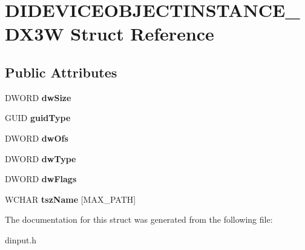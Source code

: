 \hypertarget{struct_d_i_d_e_v_i_c_e_o_b_j_e_c_t_i_n_s_t_a_n_c_e___d_x3_w}{\section{D\-I\-D\-E\-V\-I\-C\-E\-O\-B\-J\-E\-C\-T\-I\-N\-S\-T\-A\-N\-C\-E\-\_\-\-D\-X3\-W Struct Reference}
\label{struct_d_i_d_e_v_i_c_e_o_b_j_e_c_t_i_n_s_t_a_n_c_e___d_x3_w}
}
\subsection*{Public Attributes}
\begin{DoxyCompactItemize}
\item 
\hypertarget{struct_d_i_d_e_v_i_c_e_o_b_j_e_c_t_i_n_s_t_a_n_c_e___d_x3_w_a5538637b5f438adc654a96ebf8ae12fa}{D\-W\-O\-R\-D {\bfseries dw\-Size}}\label{struct_d_i_d_e_v_i_c_e_o_b_j_e_c_t_i_n_s_t_a_n_c_e___d_x3_w_a5538637b5f438adc654a96ebf8ae12fa}

\item 
\hypertarget{struct_d_i_d_e_v_i_c_e_o_b_j_e_c_t_i_n_s_t_a_n_c_e___d_x3_w_a94c5c2d3d83ded4017a022067231b21f}{G\-U\-I\-D {\bfseries guid\-Type}}\label{struct_d_i_d_e_v_i_c_e_o_b_j_e_c_t_i_n_s_t_a_n_c_e___d_x3_w_a94c5c2d3d83ded4017a022067231b21f}

\item 
\hypertarget{struct_d_i_d_e_v_i_c_e_o_b_j_e_c_t_i_n_s_t_a_n_c_e___d_x3_w_a0d449fb29324f67ea8309b64b2fd6fe8}{D\-W\-O\-R\-D {\bfseries dw\-Ofs}}\label{struct_d_i_d_e_v_i_c_e_o_b_j_e_c_t_i_n_s_t_a_n_c_e___d_x3_w_a0d449fb29324f67ea8309b64b2fd6fe8}

\item 
\hypertarget{struct_d_i_d_e_v_i_c_e_o_b_j_e_c_t_i_n_s_t_a_n_c_e___d_x3_w_a896c6388d90b67f03ad692778b1a656a}{D\-W\-O\-R\-D {\bfseries dw\-Type}}\label{struct_d_i_d_e_v_i_c_e_o_b_j_e_c_t_i_n_s_t_a_n_c_e___d_x3_w_a896c6388d90b67f03ad692778b1a656a}

\item 
\hypertarget{struct_d_i_d_e_v_i_c_e_o_b_j_e_c_t_i_n_s_t_a_n_c_e___d_x3_w_a9d2a20a79969cad2677c50c32a59524c}{D\-W\-O\-R\-D {\bfseries dw\-Flags}}\label{struct_d_i_d_e_v_i_c_e_o_b_j_e_c_t_i_n_s_t_a_n_c_e___d_x3_w_a9d2a20a79969cad2677c50c32a59524c}

\item 
\hypertarget{struct_d_i_d_e_v_i_c_e_o_b_j_e_c_t_i_n_s_t_a_n_c_e___d_x3_w_a3e711446b2e94f969692278edf981fb6}{W\-C\-H\-A\-R {\bfseries tsz\-Name} \mbox{[}M\-A\-X\-\_\-\-P\-A\-T\-H\mbox{]}}\label{struct_d_i_d_e_v_i_c_e_o_b_j_e_c_t_i_n_s_t_a_n_c_e___d_x3_w_a3e711446b2e94f969692278edf981fb6}

\end{DoxyCompactItemize}


The documentation for this struct was generated from the following file\-:\begin{DoxyCompactItemize}
\item 
dinput.\-h\end{DoxyCompactItemize}
